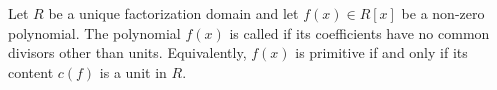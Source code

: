 Let $R$ be a unique factorization domain and let $f(x) \in R[x]$ be a non-zero polynomial. The polynomial $f(x)$ is called  if its coefficients have no common divisors other than units. Equivalently, $f(x)$ is primitive if and only if its content $c(f)$ is a unit in $R$.
